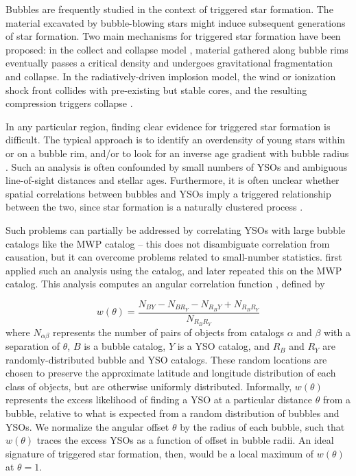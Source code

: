 \documentclass[preprint]{aastex}
\begin{document}
Bubbles are frequently studied in the context of triggered star formation. The material excavated by bubble-blowing stars might induce subsequent generations of star formation. Two main mechanisms for triggered star formation have been proposed: in the collect and collapse model \citep{Whitworth94, Dale07}, material gathered along bubble rims eventually passes a critical density and undergoes gravitational fragmentation and collapse. In the radiatively-driven implosion model, the wind or ionization shock front collides with pre-existing but stable cores, and the resulting compression triggers collapse \citep{Bertoldi89}.

In any particular region, finding clear evidence for triggered star formation is difficult. The typical approach is to identify an overdensity of young stars within or on a bubble rim, and/or to look for an inverse age gradient with bubble radius \citep{Deharveng05, Zavagno06, Koenig08}. Such an analysis is often confounded by small numbers of YSOs and ambiguous line-of-sight distances and stellar ages. Furthermore, it is often unclear whether spatial correlations between bubbles and YSOs imply a triggered relationship between the two, since star formation is a naturally clustered process \citep{Lada03}.

Such problems can partially be addressed by correlating YSOs with large bubble catalogs like the MWP catalog -- this does not disambiguate correlation from causation, but it can overcome problems related to small-number statistics. \cite{Thompson12} first applied such an analysis using the \cite{Churchwell06} catalog, and \cite{Kendrew12} later repeated this on the MWP catalog. This analysis computes an angular correlation function \citep{Landy93, Bradshaw11}, defined by

\begin{equation}
w(\theta) = \frac{N_{BY} - N_{BR_Y} - N_{R_BY} + N_{R_BR_Y}}{N_{R_BR_Y}}
\label{eq:corr}
\end{equation}
where $N_{\alpha \beta}$ represents the number of pairs of objects from catalogs $\alpha$ and $\beta$ with a separation of $\theta$, $B$ is a bubble catalog, $Y$ is a YSO catalog, and $R_B$ and $R_Y$ are randomly-distributed bubble and YSO catalogs. These random locations are chosen to preserve the approximate latitude and longitude distribution of each class of objects, but are otherwise uniformly distributed. Informally, $w(\theta)$ represents the excess likelihood of finding a YSO at a particular distance $\theta$ from a bubble, relative to what is expected from a random distribution of bubbles and YSOs. We normalize the angular offset $\theta$ by the radius of each bubble, such that $w(\theta)$ traces the excess YSOs as a function of offset in bubble radii. An ideal signature of triggered star formation, then, would be a local maximum of $w(\theta)$ at $\theta = 1$. 
\end{document}

